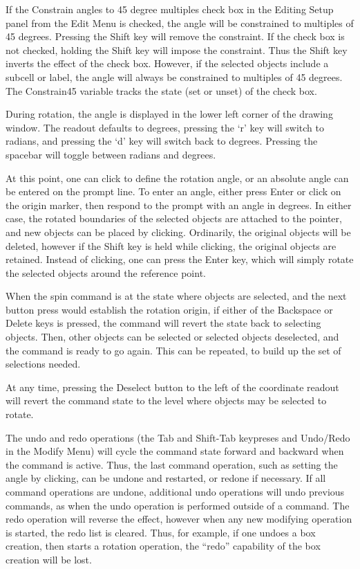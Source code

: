 If the {\cb Constrain angles to 45 degree multiples} check box in the
{\cb Editing Setup} panel from the {\cb Edit Menu} is checked, the
angle will be constrained to multiples of 45 degrees.  Pressing the
{\kb Shift} key will remove the constraint.  If the check box is not
checked, holding the {\kb Shift} key will impose the constraint.  Thus
the {\kb Shift} key inverts the effect of the check box.  However, if
the selected objects include a subcell or label, the angle will always
be constrained to multiples of 45 degrees.  The {\et Constrain45}
variable tracks the state (set or unset) of the check box.

During rotation, the angle is displayed in the lower left corner of
the drawing window.  The readout defaults to degrees, pressing the
`{\vt r}' key will switch to radians, and pressing the `{\vt d}' key
will switch back to degrees.  Pressing the spacebar will toggle
between radians and degrees.

At this point, one can click to define the rotation angle, or an
absolute angle can be entered on the prompt line.  To enter an angle,
either press {\kb Enter} or click on the origin marker, then respond
to the prompt with an angle in degrees.  In either case, the rotated
boundaries of the selected objects are attached to the pointer, and
new objects can be placed by clicking.  Ordinarily, the original
objects will be deleted, however if the {\kb Shift} key is held while
clicking, the original objects are retained.  Instead of clicking, one
can press the {\kb Enter} key, which will simply rotate the selected
objects around the reference point.

When the {\cb spin} command is at the state where objects are
selected, and the next button press would establish the rotation
origin, if either of the {\kb Backspace} or {\kb Delete} keys is
pressed, the command will revert the state back to selecting objects. 
Then, other objects can be selected or selected objects deselected,
and the command is ready to go again.  This can be repeated, to build
up the set of selections needed.

At any time, pressing the {\cb Deselect} button to the left of the
coordinate readout will revert the command state to the level where
objects may be selected to rotate.

The undo and redo operations (the {\kb Tab} and {\kb Shift-Tab}
keypreses and {\cb Undo}/{\cb Redo} in the {\cb Modify Menu}) will
cycle the command state forward and backward when the command is
active.  Thus, the last command operation, such as setting the angle
by clicking, can be undone and restarted, or redone if necessary.  If
all command operations are undone, additional undo operations will
undo previous commands, as when the undo operation is performed
outside of a command.  The redo operation will reverse the effect,
however when any new modifying operation is started, the redo list is
cleared.  Thus, for example, if one undoes a box creation, then starts
a rotation operation, the ``redo'' capability of the box creation will
be lost.

